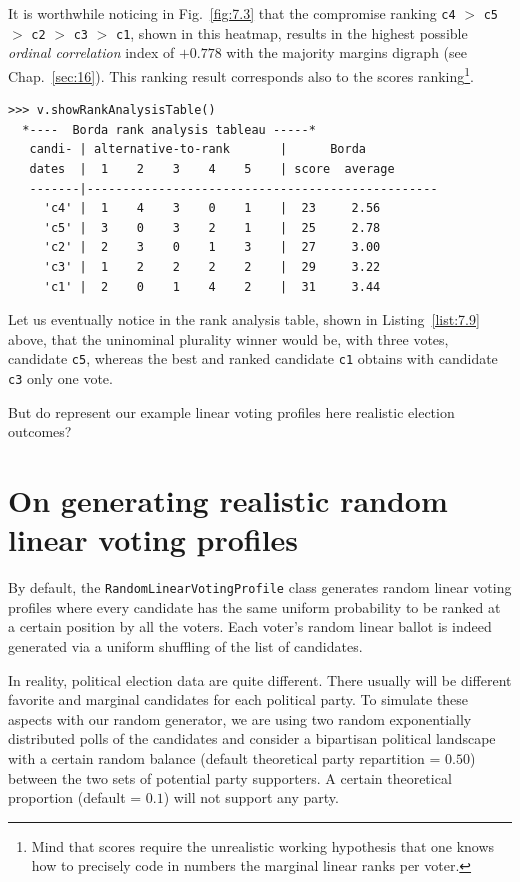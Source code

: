 It is worthwhile noticing in Fig.~\vref{fig:7.3} that the compromise \NetFlows ranking \texttt{c4} $>$ \texttt{c5} $>$ \texttt{c2} $>$ \texttt{c3} $>$ \texttt{c1}, shown in this heatmap, results in the highest possible \emph{ordinal correlation} index of $+0.778$ with the majority margins digraph (see Chap.~\ref{sec:16}). This \NetFlows ranking result corresponds also to the \Borda scores ranking\footnote{Mind that \Borda scores require the unrealistic working hypothesis that one knows how to precisely code in numbers the marginal linear ranks per voter.}.
\begin{lstlisting}[caption={Rank analysis table with \Borda scores},label=list:7.9]
>>> v.showRankAnalysisTable()
  *----  Borda rank analysis tableau -----*
   candi- | alternative-to-rank       |      Borda
   dates  |  1    2    3    4    5    | score  average
   -------|-------------------------------------------------
     'c4' |  1    4    3    0    1    |  23     2.56
     'c5' |  3    0    3    2    1    |  25     2.78
     'c2' |  2    3    0    1    3    |  27     3.00
     'c3' |  1    2    2    2    2    |  29     3.22
     'c1' |  2    0    1    4    2    |  31     3.44
\end{lstlisting}

Let us eventually notice in the rank analysis table, shown in Listing~\ref{list:7.9} above, that the uninominal plurality winner would be, with three votes, candidate \texttt{c5}, whereas the best \NetFlows and \Borda ranked candidate \texttt{c1} obtains with candidate \texttt{c3} only one vote.

But do represent our example linear voting profiles here realistic election outcomes?

\section{On generating realistic random linear voting profiles}
\label{sec:7.5}

By default, the \texttt{RandomLinearVotingProfile} class generates random linear voting profiles where every candidate has the same uniform probability to be ranked at a certain position by all the voters. Each voter's random linear ballot is indeed generated  via a uniform shuffling of the list of candidates.

In reality, political election data are quite different. There usually will be different favorite and marginal candidates for each political party. To simulate these aspects with our random generator, we are using two random exponentially distributed polls of the candidates and consider a bipartisan political landscape with a certain random balance (default theoretical party repartition = $0.50$) between the two sets of potential party supporters. A certain theoretical proportion (default = $0.1$) will not support any party.

